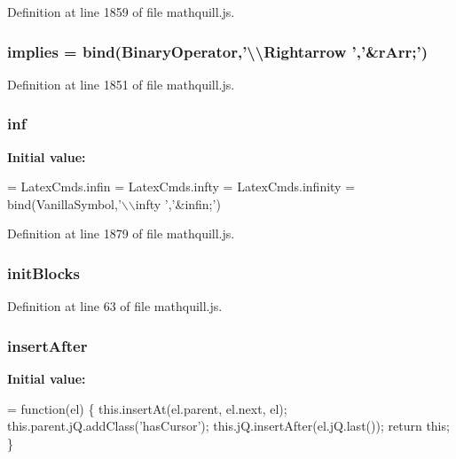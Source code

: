 Definition at line 1859 of file mathquill.\-js.

\subsubsection[{implies}]{ implies = {\bf bind}({\bf Binary\-Operator},'\textbackslash{}\textbackslash{}Rightarrow ','\&{\bf r\-Arr};')}\label{mathquill_8js_ac760956a10957f59e73a041fc43267df}


Definition at line 1851 of file mathquill.\-js.

\subsubsection[{inf}]{ inf}\label{mathquill_8js_a39f91b069d52f83122f0daa517126af1}
{\bfseries Initial value\-:}
\begin{DoxyCode}
= LatexCmds.infin = LatexCmds.infty = LatexCmds.infinity =
  bind(VanillaSymbol,\textcolor{stringliteral}{'\(\backslash\)\(\backslash\)infty '},\textcolor{stringliteral}{'&infin;'})
\end{DoxyCode}


Definition at line 1879 of file mathquill.\-js.

\subsubsection[{init\-Blocks}]{\setlength{\rightskip}{0pt plus 5cm}{\bf \-\_\-} init\-Blocks}\label{mathquill_8js_a743161c2ad8d3f4127c784c85413ada5}


Definition at line 63 of file mathquill.\-js.

\subsubsection[{insert\-After}]{\setlength{\rightskip}{0pt plus 5cm}{\bf \-\_\-} insert\-After}\label{mathquill_8js_ab909566abc25f6ecbc6426f0fd8f5a98}
{\bfseries Initial value\-:}
\begin{DoxyCode}
= \textcolor{keyword}{function}(el) \{
  this.insertAt(el.parent, el.next, el);
  this.parent.jQ.addClass(\textcolor{stringliteral}{'hasCursor'});
  this.jQ.insertAfter(el.jQ.last());
  \textcolor{keywordflow}{return} \textcolor{keyword}{this};
\}
\end{DoxyCode}


